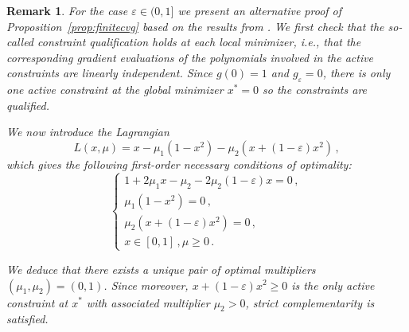 \documentclass[a4paper,12pt]{article}
\newcommand{\R}{\mathbb{R}} %
\newcommand{\cA}{\mathcal{A}} %
\newtheorem{remark}{Remark}
\newcommand{\RR}{\mathbb{R}}
\begin{document}
{
\begin{remark}
For the case $\varepsilon \in (0,1]$ we present an alternative proof of {Proposition}~\ref{prop:finitecvg} based on the results from \cite{nie2014optimality}. 
We first check that the so-called \textit{constraint qualification} holds at each local minimizer, i.e., that the corresponding gradient evaluations of the polynomials involved in the active constraints are linearly independent.  
Since $g(0) = 1$ and $g_{\varepsilon} = 0$, there is only one active constraint at the global minimizer $x^*=0$ so the constraints are qualified. 

We now introduce the Lagrangian
    \begin{equation*}
        L(x, \mu) = x - \mu_1(1-x^2) - \mu_2(x + (1-\varepsilon) x^2) \,,
    \end{equation*}
    which gives the following first-order necessary conditions of optimality:
    \begin{equation*}
        \begin{cases}
            1 + 2\mu_1x - \mu_2 - 2\mu_2(1-\varepsilon)x = 0 \,, \\
            \mu_1(1-x^2) = 0 \,, \\
            \mu_2(x + (1-\varepsilon)x^2) = 0 \,, \\
            x \in [0,1] \, , \mu \geq 0 \,.
        \end{cases}
    \end{equation*}

    We deduce that there exists a unique pair of optimal
    multipliers $(\mu_1, \mu_2) = (0, 1)$. Since moreover, 
    $x + (1-\varepsilon)x^2 \geq 0$ is the only active 
    constraint at $x^*$ with associated multiplier
    $\mu_2 > 0$, strict complementarity is satisfied.


\end{remark}}
\end{document}
